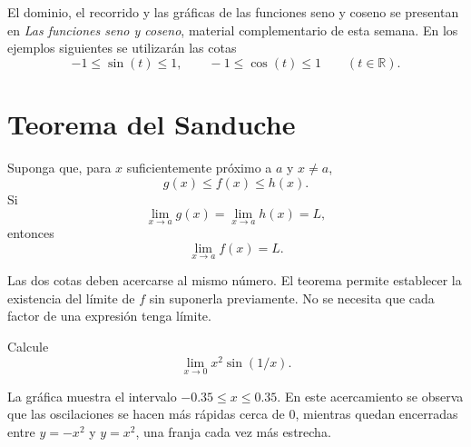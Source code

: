 \documentclass[10pt,a5paper]{article}
\newif\ifmostrarSoluciones
\begin{document}
\begin{nota}
El dominio, el recorrido y las gráficas de las funciones seno y coseno se presentan en \emph{Las funciones seno y coseno}, material complementario de esta semana. En los ejemplos siguientes se utilizarán las cotas
\[
  -1\leq\sin(t)\leq1,
  \qquad
  -1\leq\cos(t)\leq1
  \qquad (t\in\mathbb{R}).
\]
\end{nota}

\section*{Teorema del Sanduche}

\begin{teorema}
Suponga que, para $x$ suficientemente próximo a $a$ y $x\neq a$,
\[
g(x)\leq f(x)\leq h(x).
\]
Si
\[
  \lim_{x\to a}g(x)=\lim_{x\to a}h(x)=L,
\]
entonces
\[
\lim_{x\to a}f(x)=L.
\]
\end{teorema}

\begin{nota}
Las dos cotas deben acercarse al mismo número. El teorema permite establecer la existencia del límite de $f$ sin suponerla previamente. No se necesita que cada factor de una expresión tenga límite.
\end{nota}

\begin{ejemplo}
Calcule
\[
  \lim_{x\to0}x^2\sin(1/x).
\]
\end{ejemplo}
\ifmostrarSoluciones
\begin{solucion}
Para $x\neq0$, $-1\leq\sin(1/x)\leq1$. Al multiplicar por $x^2\geq0$,
\[
-x^2\leq x^2\sin(1/x)\leq x^2.
\]
Las dos cotas tienden a $0$, de modo que el límite es $0$. La oscilación permanece, pero su amplitud disminuye.
\end{solucion}
\else\vspace{18mm}\fi

\begin{center}
\end{center}
La gráfica muestra el intervalo $-0.35\leq x\leq0.35$. En este acercamiento se observa que las oscilaciones se hacen más rápidas cerca de $0$, mientras quedan encerradas entre $y=-x^2$ y $y=x^2$, una franja cada vez más estrecha.
\end{document}
